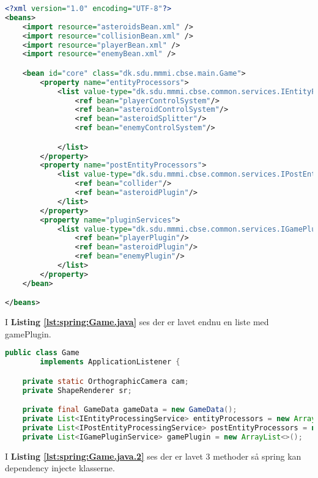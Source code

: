 \begin{lstlisting}[caption={Beans.xml}, label={lst:Beans.xml}, language=xml]
<?xml version="1.0" encoding="UTF-8"?>
<beans>
    <import resource="asteroidsBean.xml" />
    <import resource="collisionBean.xml" />
    <import resource="playerBean.xml" />
    <import resource="enemyBean.xml" />

    <bean id="core" class="dk.sdu.mmmi.cbse.main.Game">
        <property name="entityProcessors">
            <list value-type="dk.sdu.mmmi.cbse.common.services.IEntityProcessingService">
                <ref bean="playerControlSystem"/>
                <ref bean="asteroidControlSystem"/>
                <ref bean="asteroidSplitter"/>
                <ref bean="enemyControlSystem"/>

            </list>
        </property>
        <property name="postEntityProcessors">
            <list value-type="dk.sdu.mmmi.cbse.common.services.IPostEntityProcessingService">
                <ref bean="collider"/>
                <ref bean="asteroidPlugin"/>
            </list>
        </property>
        <property name="pluginServices">
            <list value-type="dk.sdu.mmmi.cbse.common.services.IGamePluginService">
                <ref bean="playerPlugin"/>
                <ref bean="asteroidPlugin"/>
                <ref bean="enemyPlugin"/>
            </list>
        </property>
    </bean>

</beans>
\end{lstlisting}

I \textbf{\textbf{Listing \ref{lst:spring:Game.java}}} ses der er lavet endnu en liste med
gamePlugin.

\begin{lstlisting}[caption={dk.sdu.mmmi.cbse.main.Game.java}, label={lst:spring:Game.java}, language=java, firstnumber=13]
public class Game
        implements ApplicationListener {

    private static OrthographicCamera cam;
    private ShapeRenderer sr;

    private final GameData gameData = new GameData();
    private List<IEntityProcessingService> entityProcessors = new ArrayList<>();
    private List<IPostEntityProcessingService> postEntityProcessors = new ArrayList<>();
    private List<IGamePluginService> gamePlugin = new ArrayList<>();
\end{lstlisting}

I \textbf{\textbf{Listing \ref{lst:spring:Game.java.2}}} ses der er lavet 3 methoder så spring kan
dependency injecte klasserne.

